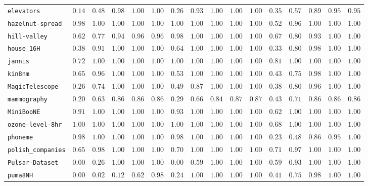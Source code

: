 {\begin{tabular}{@{}lccccccccccccccc@{}}
\texttt{elevators} & $0.14$ & $0.48$ & $0.98$ & $1.00$ & $1.00$ & $0.26$ & $0.93$ & $1.00$ & $1.00$ & $1.00$ & $0.35$ & $0.57$ & $0.89$ & $0.95$ & $0.95$ \\
\texttt{hazelnut-spread} & $0.98$ & $1.00$ & $1.00$ & $1.00$ & $1.00$ & $1.00$ & $1.00$ & $1.00$ & $1.00$ & $1.00$ & $0.52$ & $0.96$ & $1.00$ & $1.00$ & $1.00$ \\
\texttt{hill-valley} & $0.62$ & $0.77$ & $0.94$ & $0.96$ & $0.96$ & $0.98$ & $1.00$ & $1.00$ & $1.00$ & $1.00$ & $0.67$ & $0.80$ & $0.93$ & $1.00$ & $1.00$ \\
\texttt{house\_16H} & $0.38$ & $0.91$ & $1.00$ & $1.00$ & $1.00$ & $0.64$ & $1.00$ & $1.00$ & $1.00$ & $1.00$ & $0.33$ & $0.80$ & $0.98$ & $1.00$ & $1.00$ \\
\texttt{jannis} & $0.72$ & $1.00$ & $1.00$ & $1.00$ & $1.00$ & $1.00$ & $1.00$ & $1.00$ & $1.00$ & $1.00$ & $0.81$ & $1.00$ & $1.00$ & $1.00$ & $1.00$ \\
\texttt{kin8nm} & $0.65$ & $0.96$ & $1.00$ & $1.00$ & $1.00$ & $0.53$ & $1.00$ & $1.00$ & $1.00$ & $1.00$ & $0.43$ & $0.75$ & $0.98$ & $1.00$ & $1.00$ \\
\texttt{MagicTelescope} & $0.26$ & $0.74$ & $1.00$ & $1.00$ & $1.00$ & $0.49$ & $0.87$ & $1.00$ & $1.00$ & $1.00$ & $0.38$ & $0.80$ & $0.96$ & $1.00$ & $1.00$ \\
\texttt{mammography} & $0.20$ & $0.63$ & $0.86$ & $0.86$ & $0.86$ & $0.29$ & $0.66$ & $0.84$ & $0.87$ & $0.87$ & $0.43$ & $0.71$ & $0.86$ & $0.86$ & $0.86$ \\
\texttt{MiniBooNE} & $0.91$ & $1.00$ & $1.00$ & $1.00$ & $1.00$ & $0.93$ & $1.00$ & $1.00$ & $1.00$ & $1.00$ & $0.62$ & $1.00$ & $1.00$ & $1.00$ & $1.00$ \\
\texttt{ozone-level-8hr} & $1.00$ & $1.00$ & $1.00$ & $1.00$ & $1.00$ & $1.00$ & $1.00$ & $1.00$ & $1.00$ & $1.00$ & $0.68$ & $1.00$ & $1.00$ & $1.00$ & $1.00$ \\
\texttt{phoneme} & $0.98$ & $1.00$ & $1.00$ & $1.00$ & $1.00$ & $0.98$ & $1.00$ & $1.00$ & $1.00$ & $1.00$ & $0.23$ & $0.48$ & $0.86$ & $0.95$ & $1.00$ \\
\texttt{polish\_companies} & $0.65$ & $0.98$ & $1.00$ & $1.00$ & $1.00$ & $0.70$ & $1.00$ & $1.00$ & $1.00$ & $1.00$ & $0.71$ & $0.97$ & $1.00$ & $1.00$ & $1.00$ \\
\texttt{Pulsar-Dataset} & $0.00$ & $0.26$ & $1.00$ & $1.00$ & $1.00$ & $0.00$ & $0.59$ & $1.00$ & $1.00$ & $1.00$ & $0.59$ & $0.93$ & $1.00$ & $1.00$ & $1.00$ \\
\texttt{puma8NH} & $0.00$ & $0.02$ & $0.12$ & $0.62$ & $0.98$ & $0.24$ & $1.00$ & $1.00$ & $1.00$ & $1.00$ & $0.41$ & $0.75$ & $0.98$ & $1.00$ & $1.00$ \\

\end{tabular}}
